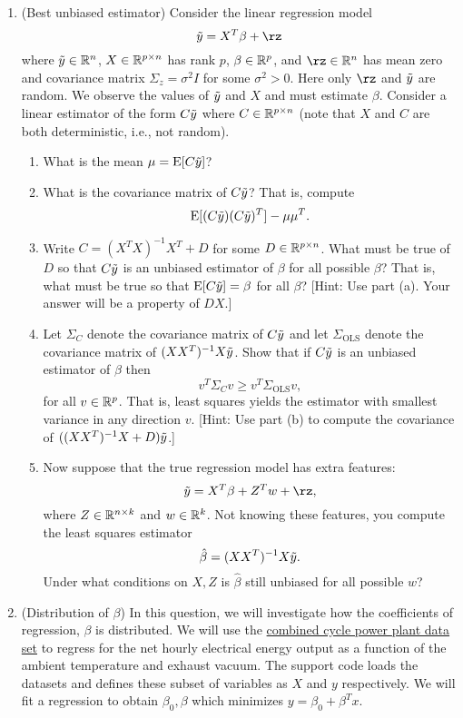 \documentclass[12pt,twoside]{article}
\begin{document}
\begin{enumerate}
\item (Best unbiased estimator) Consider the linear regression model
  $$\ry = X^T\beta + \rz$$
  where $\tilde{  y }\in\mathbb{R}^n$, $X\in\mathbb{R}^{p \times n}$ has rank $p$,
  $\beta\in\mathbb{R}^p$, and $\rz\in\R^n$ has mean
  zero and covariance matrix $\Sigma_{z}=\sigma^2I$ for some
  $\sigma^2>0$.  Here only $\rz$ and $\tilde{  y }$ are random.  We observe
  the values of $\tilde{  y }$ and $X$ and must estimate $\beta$.
  Consider a linear estimator of the form $C\tilde{  y }$
  where $C\in\mathbb{R}^{p\times n}$ (note that $X$ and $C$ are both
  deterministic, i.e., not random).
  \begin{enumerate}
  \item What is the mean $\mu=\mathrm{E}[C\tilde{  y }]$?
  \item What is the covariance matrix of $C\tilde{  y }$? That is, compute
    $$\mathrm{E}[(C\tilde{  y })(C\tilde{  y })^T]-\mu\mu^T.$$
  \item Write $C=(X^TX)^{-1}X^T+D$ for some $D\in\mathbb{R}^{p\times n}$.
    What must be true of $D$ so that $C\tilde{  y }$ is an unbiased estimator
    of $\beta$ for all possible $\beta$?  That is, what must be true
    so that $\mathrm{E}[C\tilde{  y }]=\beta$ for all $\beta$? [Hint: Use part (a).
    Your answer will be a property of $DX$.]
  \item Let $\Sigma_C$ denote the covariance matrix of $C\tilde{  y }$ and let
    $\Sigma_{\text{OLS}}$ denote the covariance matrix of $(XX^T)^{-1}X \tilde{  y }$.
    Show that if $C\tilde{  y }$ is an unbiased estimator of $\beta$ then
    $$v^T\Sigma_Cv \geq v^T\Sigma_{\text{OLS}}v,$$
    for all $v\in\mathbb{R}^p$.  That is, least squares yields
    the estimator with smallest variance in any direction
    $v$. [Hint: Use part (b) to compute the covariance of
      $((XX^T)^{-1}X+D)\tilde{  y }$.]
  \item Now suppose that the true regression model has extra features:
    $$\ry = X^T\beta + Z^T w + \rz,$$
    where $Z\in \mathbb{R}^{n\times k}$ and $w\in\mathbb{R}^k$.  Not knowing
    these features, you compute the least squares estimator
    $$\hat{\beta} = (XX^T)^{-1}X\tilde{  y }.$$
    Under what conditions on $X,Z$ is $\hat{\beta}$ still unbiased for all
    possible $w$?
  \end{enumerate}   
   
\item (Distribution of $\beta$)  In this question, we will investigate how the coefficients of regression, $\beta$ is distributed. We will use the \href{https://archive.ics.uci.edu/ml/datasets/Combined+Cycle+Power+Plant}{combined cycle power plant data set} to regress for the net hourly electrical energy output as a function of the ambient temperature and exhaust vacuum. The support code loads the datasets and defines these subset of variables as $X$ and $y$ respectively. We will fit a regression to obtain $\beta_0, \beta$ which minimizes $y = \beta_0 + \beta^Tx$. 


\end{enumerate}
\end{document}
